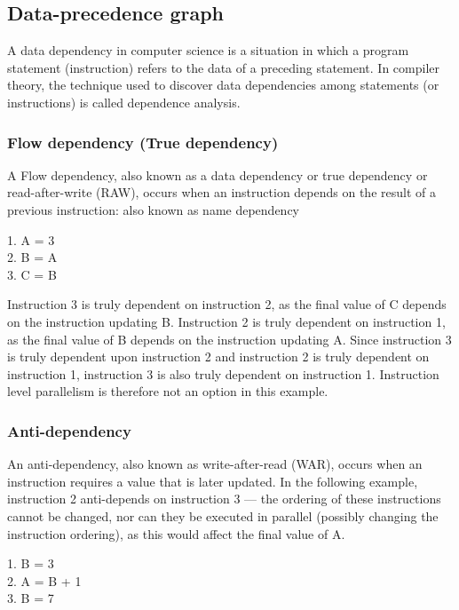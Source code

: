 \subsection{Data-precedence graph}


A data dependency in computer science is a situation in which a program statement (instruction) refers to the data of a preceding statement. In compiler theory, the technique used to discover data dependencies among statements (or instructions) is called dependence analysis.


\subsubsection{Flow dependency (True dependency)}

A Flow dependency, also known as a data dependency or true dependency or read-after-write (RAW), occurs when an instruction depends on the result of a previous instruction: also known as name dependency


\begin{center}
1. A = 3\\
2. B = A\\
3. C = B
\end{center}
Instruction 3 is truly dependent on instruction 2, as the final value of C depends on the instruction updating B. Instruction 2 is truly dependent on instruction 1, as the final value of B depends on the instruction updating A. Since instruction 3 is truly dependent upon instruction 2 and instruction 2 is truly dependent on instruction 1, instruction 3 is also truly dependent on instruction 1. Instruction level parallelism is therefore not an option in this example.

\subsubsection{Anti-dependency}
An anti-dependency, also known as write-after-read (WAR), occurs when an instruction requires a value that is later updated. In the following example, instruction 2 anti-depends on instruction 3 — the ordering of these instructions cannot be changed, nor can they be executed in parallel (possibly changing the instruction ordering), as this would affect the final value of A.
\begin{center}
    1. B = 3 \\
    2. A = B + 1 \\
    3. B = 7
    \end{center}


